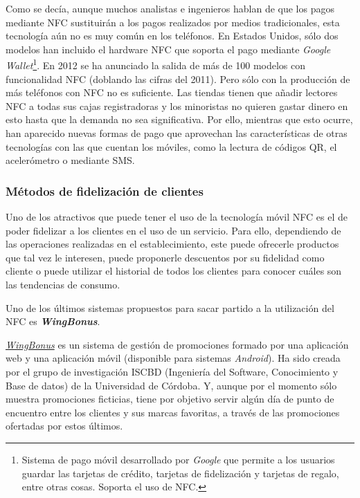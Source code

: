   Como se decía, aunque muchos analistas e ingenieros hablan de que los 
  pagos mediante \acs{NFC} sustituirán a los pagos realizados por medios
  tradicionales, esta tecnología aún no es muy común en los teléfonos. En
  Estados Unidos, sólo dos modelos han incluido el hardware \acs{NFC}
  que soporta el pago mediante \emph{Google Wallet}\footnote{Sistema de pago 
  móvil desarrollado por \emph{Google} que permite a los usuarios guardar las 
  tarjetas de crédito, tarjetas de fidelización y tarjetas de regalo, entre 
  otras cosas. Soporta el uso de \acs{NFC}.}. En 2012 se ha anunciado
  la salida de más de 100 modelos con funcionalidad \acs{NFC} (doblando las 
  cifras del 2011). Pero sólo con la producción de más teléfonos con \acs{NFC} 
  no es suficiente. Las tiendas tienen que añadir lectores \acs{NFC} a todas
  sus cajas registradoras y los minoristas no quieren gastar dinero en esto
  hasta que la demanda no sea significativa. Por ello, mientras que esto 
  ocurre, han aparecido nuevas formas de pago que aprovechan las 
  características de otras tecnologías con las que cuentan los móviles, como 
  la lectura de códigos \acs{QR}, el acelerómetro o mediante
  \acs{SMS}\cite{bib:noWaiting}.

    \subsubsection{Métodos de fidelización de clientes}
  Uno de los atractivos que puede tener el uso de la tecnología móvil \acs{NFC}
  es el de poder fidelizar a los clientes en el uso de un servicio. Para ello,
  dependiendo de las operaciones realizadas en el
  establecimiento, este puede ofrecerle productos que tal vez le interesen,
  puede proponerle descuentos por su fidelidad como cliente o puede utilizar
  el historial de todos los clientes para conocer cuáles son las tendencias
  de consumo.
  
  Uno de los últimos sistemas propuestos para sacar 
  partido a la utilización del \acs{NFC} es \emph{\textbf{WingBonus}}.

  \emph{\href{http://wingbonus.com/}{WingBonus}} es un sistema de
  gestión de promociones formado por una aplicación web y una aplicación móvil
  (disponible para sistemas \emph{Android}). Ha sido creada por el grupo de 
  investigación ISCBD (Ingeniería del Software, Conocimiento y Base de datos) 
  de la Universidad de Córdoba. Y, aunque por el momento sólo muestra 
  promociones ficticias, tiene por objetivo servir algún día de punto de 
  encuentro entre los clientes y sus marcas favoritas, a través de las 
  promociones ofertadas por estos últimos.
  
